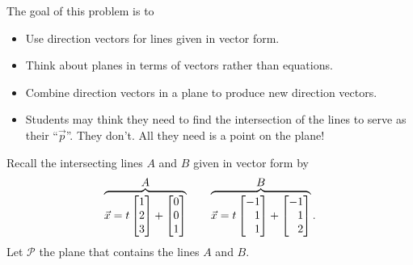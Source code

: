 \documentclass{problemset}
\begin{document}
	\question
	\begin{annotation}
		\begin{goals}

			The goal of this problem is to
			\begin{itemize}
				\item Use direction vectors for lines given in vector form.
				\item Think about planes in terms of vectors rather
					than equations.
				\item Combine direction vectors in a plane to produce new direction vectors.
			\end{itemize}
		\end{goals}

		\begin{notes}
			\begin{itemize}
				\item Students may think they need to find the intersection
					of the lines to serve as their ``$\vec p$''.
					They don't. All they need is a point
					on the plane!
			\end{itemize}
		\end{notes}
	\end{annotation}
	Recall the intersecting lines $A$ and $B$ given in vector form by
	\[
		\overbrace{\vec x=t\mat{1\\2\\3}+\mat{0\\0\\1}}^{\displaystyle A}
		\qquad
		\overbrace{\vec x=t\mat{-1\\1\\1}+\mat{-1\\1\\2}}^{\displaystyle B}.
	\]
	Let $\mathcal P$ the plane that contains the lines $A$ and $B$.
\end{document}
